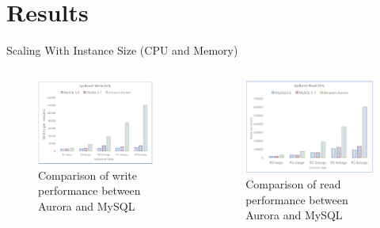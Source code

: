   \section{Results}
    \begin{frame}{Scaling With Instance Size (CPU and Memory)}
      \vspace{-6mm}
      \begin{columns}
        \begin{figure}[t]
          \includegraphics[width=0.9\textwidth]{../images/write_only.png}
          \caption{Comparison of write performance between Aurora and MySQL}
          \centering
        \end{figure}
        \pause
        \begin{figure}[t]
          \includegraphics[width=\textwidth]{../images/read_only.png}
          \caption{Comparison of read performance between Aurora and MySQL}
          \centering
        \end{figure}
      \end{columns}
    \end{frame}

